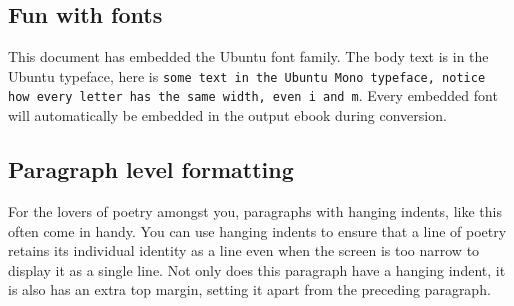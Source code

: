 \documentclass[11pt]{article}
\begin{document}
\subsection[{Fun with fonts}]{\protect\textcolor{hex4F81BD}{Fun with fonts}}\label{_Toc1074133965}\label{fun-with-fonts}

This document has embedded the Ubuntu font family. The body text is in the Ubuntu typeface, here is \texttt{some text in the Ubuntu Mono typeface, notice how every letter has the same width, even i and m}. Every embedded font will automatically be embedded in the output ebook during conversion.

\subsection[{Paragraph level formatting}]{\protect\textcolor{hex4F81BD}{Paragraph level formatting}}\label{_Paragraph_level_formatting}\label{_Toc2022725662}\label{paragraph-level-formatting}

{\par}

{\leftskip=36pt\hangindent=36pt For the lovers of poetry amongst you, paragraphs with hanging indents, like this often come in handy. You can use hanging indents to ensure that a line of poetry retains its individual identity as a line even when the screen is  too narrow to display it as a single line. Not only does this paragraph have a hanging indent, it is also has an extra top margin, setting it apart from the preceding paragraph.\par}
\end{document}
